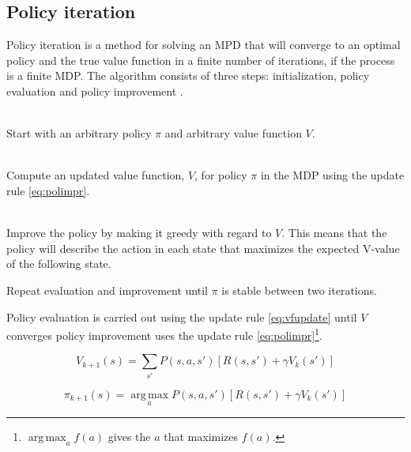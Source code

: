 \subsection{Policy iteration}
\label{sec:pol_itr}

Policy iteration is a method for solving an MPD that will converge to an
optimal policy and the true value function in a finite number of iterations, if
the process is a finite MDP. The algorithm consists of three steps:
initialization, policy evaluation and policy improvement
\parencite{barto1998reinforcement}.

\begin{description}
\item[Initialization] \hfill \\
    Start with an arbitrary policy $\pi$ and arbitrary value function $V$.
\item[Policy evaluation] \hfill \\
    Compute an updated value function, $V$, for policy $\pi$ in the MDP using the update rule \eqref{eq:polimpr}.
\item[Policy improvement] \hfill \\
    Improve the policy by making it greedy with regard to $V$. This means that the policy will describe the action in each state that maximizes the expected V-value of the following state. 
\item Repeat evaluation and improvement until $\pi$ is stable between two iterations.
\end{description}

Policy evaluation is carried out using the update rule \eqref{eq:vfupdate} until $V$ converges
policy improvement uses the update rule \eqref{eq:polimpr}\footnote{$\operatorname*{arg\,max} _a f(a)$ gives the $a$ that maximizes $f(a)$.}.


\begin{equation} \label{eq:vfupdate}
V_{k+1} (s) = \sum_{s'} P(s, a, s') \left[ R(s, s') + \gamma V_k(s')  \right]
\end{equation}

\begin{equation} \label{eq:polimpr}
\pi_{k+1} (s) = \operatorname*{arg\,max}_a P(s, a, s') \left[ R(s, s') + \gamma V_k(s') \right]
\end{equation}
